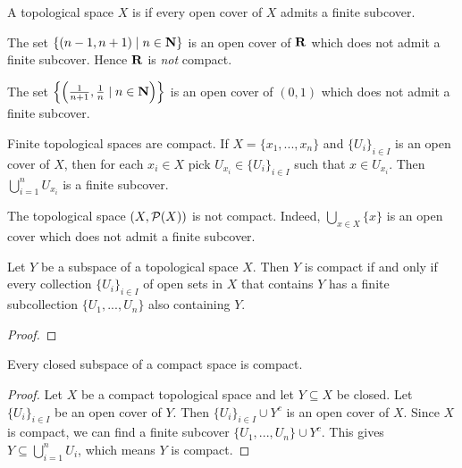 \begin{definition}
    A topological space $X$ is  if every open cover of $X$ admits a finite subcover.
\end{definition}

\begin{example}
    The set $\{(n-1,n+1) \mid n \in \mathbf{N}\}$ is an open cover of $\mathbf{R}$ which does not admit a finite subcover. Hence $\mathbf{R}$ is \textit{not} compact.
\end{example}

\begin{example}
    The set $\left\{ \left( \frac{1}{n+1}, \frac{1}{n} \mid n \in \mathbf{N} \right) \right\}$ is an open cover of $(0,1)$ which does not admit a finite subcover.
\end{example}

\begin{example}
    Finite topological spaces are compact. If $X = \{x_1,...,x_n\}$ and $\{U_i\}_{i \in I}$ is an open cover of $X$, then for each $x_i \in X$ pick $U_{x_i} \in \{U_i\}_{i \in I}$ such that $x \in U_{x_i}$. Then $\bigcup_{i=1}^n U_{x_i}$ is a finite subcover.
\end{example}

\begin{example}
    The topological space $(X,\mathcal{P}(X))$ is not compact. Indeed, $\bigcup_{x \in X}\{x\}$ is an open cover which does not admit a finite subcover.
\end{example}

\begin{proposition}
    Let $Y$ be a subspace of a topological space $X$. Then $Y$ is compact if and only if every collection $\{U_i\}_{i \in I}$ of open sets in $X$ that contains $Y$ has a finite subcollection $\{U_1,...,U_n\}$ also containing $Y$.
\end{proposition}
    {\color{red} \begin{proof}
        
    \end{proof}}

\begin{proposition}
    Every closed subspace of a compact space is compact.
\end{proposition}
    \begin{proof}
        Let $X$ be a compact topological space and let $Y \subseteq X$ be closed. Let $\{U_i\}_{i \in I}$ be an open cover of $Y$. Then $\{U_i\}_{i\in I} \cup Y^c$ is an open cover of $X$. Since $X$ is compact, we can find a finite subcover $\{U_1,...,U_n\} \cup Y^c$. This gives $Y \subseteq \bigcup_{i = 1}^n U_i$, which means $Y$ is compact.
    \end{proof}

